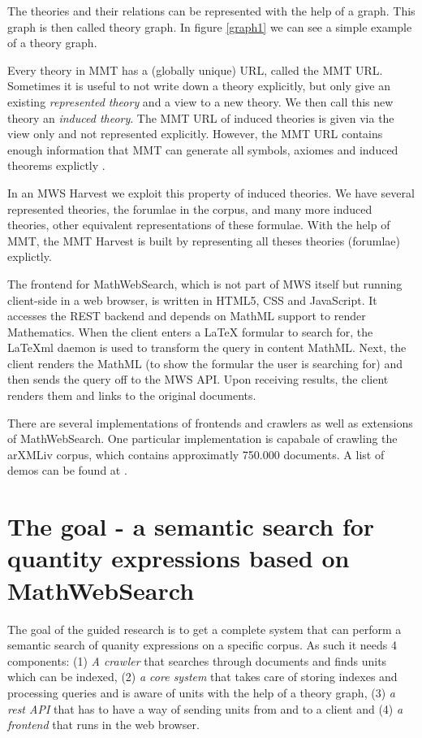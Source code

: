 \documentclass[11pt]{article}
\begin{document}
The theories and their relations can be represented with the help of a graph. This graph is then called theory graph. In figure \ref{graph1} we can see a simple example of a theory graph.



Every theory in MMT has a (globally unique) URL, called the MMT URL. Sometimes it is useful to not write down a theory explicitly, but only give an existing \textit{represented theory} and a view to a new theory. We then call this new theory an \textit{induced theory}. The MMT URL of induced theories is given via the view only and not represented explicitly. However, the MMT URL contains enough information that MMT can generate all symbols, axiomes and induced theorems explictly \cite{IanKohProd:rassmk14}.

In an MWS Harvest we exploit this property of induced theories. We have several represented theories, the forumlae in the corpus, and many more induced theories, other equivalent representations of these formulae. With the help of MMT, the MMT Harvest is built by representing all theses theories (forumlae) explictly.

The frontend for MathWebSearch, which is not part of MWS itself but running client-side in a web browser, is written in HTML5, CSS and JavaScript. It accesses the REST backend and depends on MathML support to render Mathematics. When the client enters a \LaTeX{} formular to search for, the \LaTeX{}ml daemon \cite{latexml-daemon} is used to transform the query in content MathML. Next, the client renders the MathML (to show the formular the user is searching for) and then sends the query off to the MWS API. Upon receiving results, the client renders them and links to the original documents.

There are several implementations of frontends and crawlers as well as extensions of MathWebSearch. One particular implementation is capabale of crawling the arXMLiv corpus, which contains approximatly 750.000 documents. A list of demos can be found at \cite{URL:MWSDemo}.

\section{The goal - a semantic search for quantity expressions based on MathWebSearch}
\label{sec:extension}

The goal of the guided research is to get a complete system that can perform a semantic search of quanity expressions on a specific corpus.  As such it needs 4 components: (1) \textit{A crawler} that searches through documents and finds units which can be indexed, (2) \textit{a core system} that takes care of storing indexes and processing queries and is aware of units with the help of a theory graph, (3) \textit{a rest API} that has to have a way of sending units from and to a client and (4) \textit{a frontend} that runs in the web browser.
\end{document}
